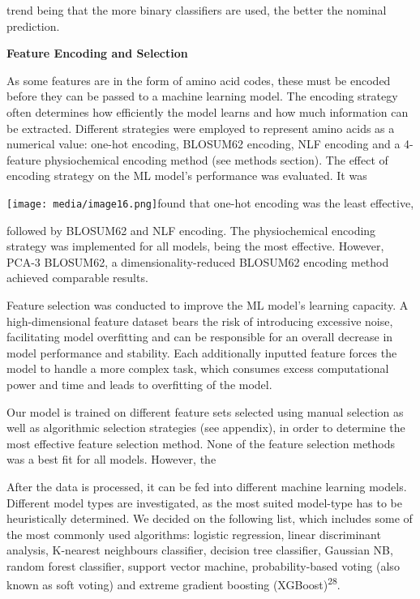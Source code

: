 \documentclass[
]{article}
\begin{document}
trend being that the more binary classifiers are used, the better the
nominal prediction.

\textbf{Feature Encoding and Selection}

As some features are in the form of amino acid codes, these must be
encoded before they can be passed to a machine learning model. The
encoding strategy often determines how efficiently the model learns and
how much information can be extracted. Different strategies were
employed to represent amino acids as a numerical value: one-hot
encoding, BLOSUM62 encoding, NLF encoding and a 4-feature physiochemical
encoding method (see methods section). The effect of encoding strategy
on the ML model's performance was evaluated. It was

\texttt{[image: media/image16.png]}found
that one-hot encoding was the least effective,

followed by BLOSUM62 and NLF encoding. The physiochemical encoding
strategy was implemented for all models, being the most effective.
However, PCA-3 BLOSUM62, a dimensionality-reduced BLOSUM62 encoding
method achieved comparable results.

Feature selection was conducted to improve the ML model's learning
capacity. A high-dimensional feature dataset bears the risk of
introducing excessive noise, facilitating model overfitting and can be
responsible for an overall decrease in model performance and stability.
Each additionally inputted feature forces the model to handle a more
complex task, which consumes excess computational power and time and
leads to overfitting of the model.

Our model is trained on different feature sets selected using manual
selection as well as algorithmic selection strategies (see appendix), in
order to determine the most effective feature selection method. None of
the feature selection methods was a best fit for all models. However,
the

After the data is processed, it can be fed into different machine
learning models. Different model types are investigated, as the most
suited model-type has to be heuristically determined. We decided on the
following list, which includes some of the most commonly used
algorithms: logistic regression, linear discriminant analysis, K-nearest
neighbours classifier, decision tree classifier, Gaussian NB, random
forest classifier, support vector machine, probability-based voting
(also known as soft voting) and extreme gradient boosting
(XGBoost)\textsuperscript{28}.
\end{document}
